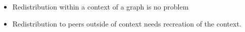   \begin{itemize}

  \item Redistribution within a context of a graph is no problem
  \item Redistribution to peers outside of context needs recreation of
    the context.

  \end{itemize}


\cleardoublepage

